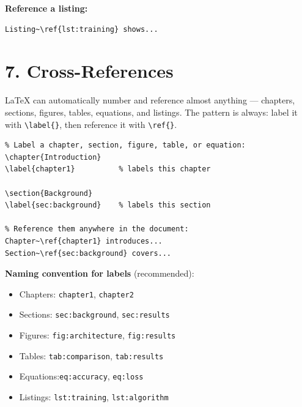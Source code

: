 \noindent
\textbf{Reference a listing:}

\begin{verbatim}
Listing~\ref{lst:training} shows...
\end{verbatim}


\section*{7. Cross-References}

\noindent
LaTeX can automatically number and reference almost anything —
chapters, sections, figures, tables, equations, and listings.
The pattern is always: label it with \verb|\label{}|, then
reference it with \verb|\ref{}|.

\begin{verbatim}
% Label a chapter, section, figure, table, or equation:
\chapter{Introduction}
\label{chapter1}          % labels this chapter

\section{Background}
\label{sec:background}    % labels this section

% Reference them anywhere in the document:
Chapter~\ref{chapter1} introduces...
Section~\ref{sec:background} covers...
\end{verbatim}

\noindent
\textbf{Naming convention for labels} (recommended):
\begin{itemize}
    \item Chapters: \texttt{chapter1}, \texttt{chapter2}
    \item Sections: \texttt{sec:background}, \texttt{sec:results}
    \item Figures:  \texttt{fig:architecture}, \texttt{fig:results}
    \item Tables:   \texttt{tab:comparison}, \texttt{tab:results}
    \item Equations:\texttt{eq:accuracy}, \texttt{eq:loss}
    \item Listings: \texttt{lst:training}, \texttt{lst:algorithm}
\end{itemize}


